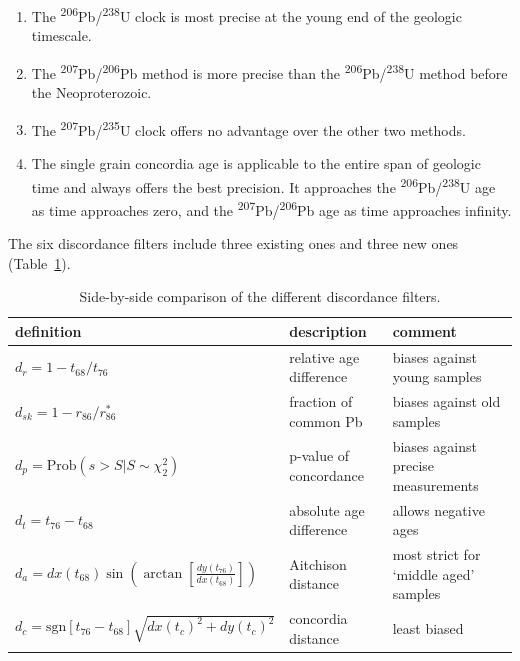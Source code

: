 \documentclass[gchron, manuscript]{copernicus}
\begin{document}
\begin{enumerate}
  \item The \textsuperscript{206}Pb/\textsuperscript{238}U clock is
    most precise at the young end of the geologic timescale.
  \item The \textsuperscript{207}Pb/\textsuperscript{206}Pb method is
    more precise than the
    \textsuperscript{206}Pb/\textsuperscript{238}U method before the
    Neoproterozoic.
  \item The \textsuperscript{207}Pb/\textsuperscript{235}U clock
    offers no advantage over the other two methods.
  \item The single grain concordia age is applicable to the entire
    span of geologic time and always offers the best precision. It
    approaches the \textsuperscript{206}Pb/\textsuperscript{238}U age
    as time approaches zero, and the
    \textsuperscript{207}Pb/\textsuperscript{206}Pb age as time
    approaches infinity.
\end{enumerate}

\noindent The six discordance filters include three existing ones and
three new ones (Table~\ref{tab:summary}).

\begin{table}
  \begin{tabular}{lll}
    definition & description & comment \\ \hline
    $d_{r} = 1 - t_{68}/t_{76}$ &
    relative age difference &
    biases against young samples \\
    $d_{sk} = 1 - r_{86}/r_{86}^\ast$ & fraction of common Pb &
    biases against old samples \\
    $d_p = \mbox{Prob}\left(s > S | S \sim \chi^2_2\right)$ &
    p-value of concordance &
    biases against precise measurements \\
    $d_{t} = t_{76} - t_{68}$ & absolute age difference &  allows negative ages \\
    $d_{a} = dx(t_{68}) \sin\!\left(\arctan\!\left[
      \frac{dy(t_{76})}{dx(t_{68})} \right] \right)$ & Aitchison distance &
    most strict for `middle aged' samples \\
    $d_c = \mbox{sgn}[t_{76}-t_{68}] \sqrt{ dx(t_c)^2 + dy(t_c)^2 }$ &
    concordia distance & least biased
  \end{tabular}
  \caption{Side-by-side comparison of the different discordance filters.}
  \label{tab:summary}
\end{table}
\end{document}
